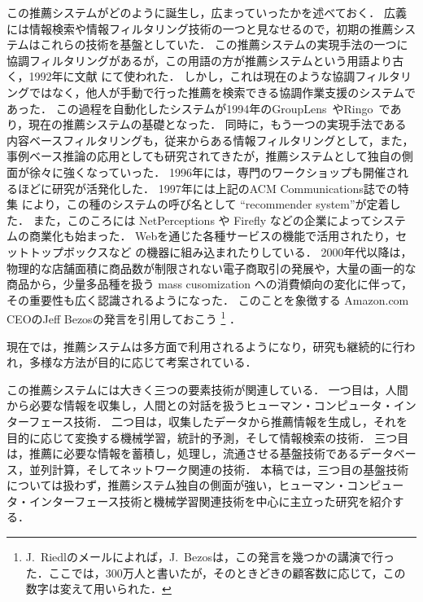 この推薦システムがどのように誕生し，広まっていったかを述べておく．
広義には情報検索や情報フィルタリング技術の一つと見なせるので，初期の推薦システムはこれらの技術を基盤としていた．
この推薦システムの実現手法の一つに協調フィルタリングがあるが，この用語の方が推薦システムという用語より古く，1992年に文献 \cite{macm:92:01} にて使われた．
しかし，これは現在のような協調フィルタリングではなく，他人が手動で行った推薦を検索できる協調作業支援のシステムであった．
この過程を自動化したシステムが1994年のGroupLens~\cite{cscw:94:01}やRingo~\cite{sigchi:95:02}であり，現在の推薦システムの基礎となった．
同時に，もう一つの実現手法である内容ベースフィルタリングも，従来からある情報フィルタリングとして，また，事例ベース推論の応用としても研究されてきたが，推薦システムとして独自の側面が徐々に強くなっていった．
1996年には，専門のワークショップも開催されるほどに研究が活発化した．
1997年には上記のACM Communications誌での特集\cite{macm:97:01} により，この種のシステムの呼び名として ``recommender system''が定着した．
また，このころには NetPerceptions や Firefly などの企業によってシステムの商業化も始まった．
Webを通じた各種サービスの機能で活用されたり\cite{ieeem:99:02,ieeem:03:01,www:07:01}，セットトップボックスなど
の機器に組み込まれたり\cite{kdd:04:11}している．
2000年代以降は，物理的な店舗面積に商品数が制限されない電子商取引の発展や，大量の画一的な商品から，少量多品種を扱う mass cusomization への消費傾向の変化に伴って，その重要性も広く認識されるようになった．
このことを象徴する Amazon.com CEOのJeff Bezosの発言を引用しておこう\cite{dmkd:01:01}%
\footnote{J.~Riedlのメールによれば，J.~Bezosは，この発言を幾つかの講演で行った．ここでは，300万人と書いたが，そのときどきの顧客数に応じて，この数字は変えて用いられた．} ．
\begin{center}
\setlength{\fboxsep}{1zw}
\end{center}
現在では，推薦システムは多方面で利用されるようになり，研究も継続的に行われ，多様な方法が目的に応じて考案されている．

この推薦システムには大きく三つの要素技術が関連している．
一つ目は，人間から必要な情報を収集し，人間との対話を扱うヒューマン・コンピュータ・インターフェース技術．
二つ目は，収集したデータから推薦情報を生成し，それを目的に応じて変換する機械学習，統計的予測，そして情報検索の技術．
三つ目は，推薦に必要な情報を蓄積し，処理し，流通させる基盤技術であるデータベース，並列計算，そしてネットワーク関連の技術．
本稿では，三つ目の基盤技術については扱わず，推薦システム独自の側面が強い，ヒューマン・コンピュータ・インターフェース技術と機械学習関連技術を中心に主立った研究を紹介する．
